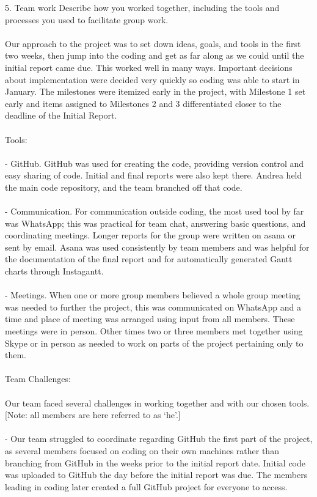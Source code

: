 \documentclass[11pt]{article}
\begin{document}
5. Team work Describe how you worked together, including the tools and processes you used to facilitate group work.
\\ \\

Our approach to the project was to set down ideas, goals, and tools in the first two weeks, then jump into the coding and get as far along as we could until the initial report came due. This worked well in many ways. Important decisions about implementation were decided very quickly so coding was able to start in January. The milestones were itemized early in the project, with Milestone 1 set early and items assigned to Milestones 2 and 3 differentiated closer to the deadline of the Initial Report.
\\ \\
Tools: 
\\ \\
- GitHub.  GitHub was used for creating the code, providing version control and easy sharing of code. Initial and final reports were also kept there. Andrea held the main code repository, and the team branched off that code.
\\ \\
- Communication.  For communication outside coding, the most used tool by far was WhatsApp; this was practical for team chat, answering basic questions, and coordinating meetings. Longer reports for the group were written on asana or sent by email. Asana was used consistently by team members and was helpful for the documentation of the final report and for automatically generated Gantt charts through Instagantt.
\\ \\
- Meetings.  When one or more group members believed a whole group meeting was needed to further the project, this was communicated on WhatsApp and a time and place of meeting was arranged using input from all members. These meetings were in person.  Other times two or three members met together using Skype or in person as needed to work on parts of the project pertaining only to them.
\\ \\
Team Challenges:
\\ \\
Our team faced several challenges in working together and with our chosen tools. [Note: all members are here referred to as ‘he’.] 
\\ \\
- Our team struggled to coordinate regarding GitHub the first part of the project, as several members focused on coding on their own machines rather than branching from GitHub in the weeks prior to the initial report date. Initial code was uploaded to GitHub the day before the initial report was due. The members leading in coding later created a full GitHub project for everyone to access. 
\end{document}
